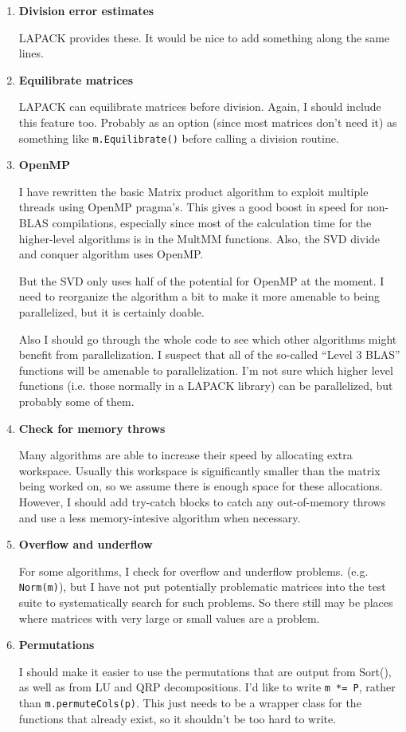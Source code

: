 \documentclass[twoside,letterpaper,11pt]{article}
\renewcommand{\tt}[1]{{\lstinline {#1}}}
\begin{document}
\begin{enumerate}
\item
\textbf{Division error estimates}

LAPACK provides these.  It would be nice to add something along the same lines.

\item
\textbf{Equilibrate matrices}

LAPACK can equilibrate matrices before division.  Again, I should include this
feature too.  Probably as an option (since most matrices don't need it)
as something like \tt{m.Equilibrate()} before calling a division routine.

\item
\textbf{OpenMP}

I have rewritten the basic Matrix product algorithm to exploit multiple threads using 
OpenMP pragma's.  This gives a good boost in speed for non-BLAS 
compilations, especially since most of the calculation time for the higher-level
algorithms is in the MultMM functions.  Also, the SVD divide and conquer
algorithm uses OpenMP.  

But the SVD only uses half of the potential for OpenMP at the moment.  I need
to reorganize the algorithm a bit to make it more amenable to being parallelized,
but it is certainly doable.

Also I should go through the whole code to
see which other algorithms might benefit from parallelization.  I suspect that all of
the so-called ``Level 3 BLAS'' functions will be amenable to parallelization.  I'm not sure
which higher level functions (i.e. those normally in a LAPACK library) can
be parallelized, but probably some of them.

\item
\textbf{Check for memory throws}

Many algorithms are able to increase their speed by allocating extra
workspace.  Usually this workspace is significantly smaller than the
matrix being worked on, so we assume there is enough space for 
these allocations.  However, I should add try-catch blocks to catch 
any out-of-memory throws and use a less memory-intesive algorithm
when necessary.

\item
\textbf{Overflow and underflow}

For some algorithms, I check for overflow and underflow problems.
(e.g. \tt{Norm(m)}), but I have not put potentially problematic matrices
into the test suite to systematically search for such problems.  So there still
may be places where matrices with very large or small values are a problem.

\item
\textbf{Permutations}

I should make it easier to use the permutations that are output from 
Sort(), as well as from LU and QRP decompositions.   I'd like to write
\tt{m *= P}, rather than \tt{m.permuteCols(p)}.  This just needs to be a wrapper
class for the functions that already exist, so it shouldn't be too hard to write.

\end{enumerate}
\end{document}
